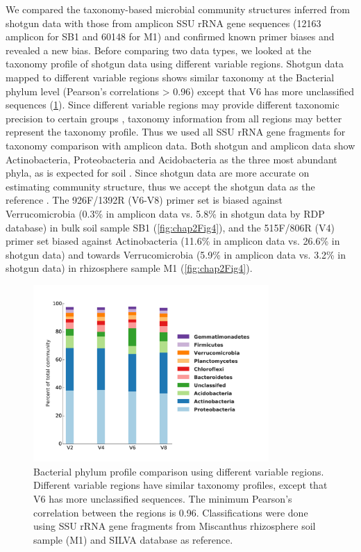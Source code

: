 \documentclass[]{msu-thesis}
\begin{document}
We compared the taxonomy-based microbial community structures inferred from shotgun data with those from amplicon SSU rRNA gene sequences (12163 amplicon for SB1 and 60148 for M1) and confirmed known primer biases and revealed a new bias. Before comparing two data types, we looked at the taxonomy profile of shotgun data using different variable regions. Shotgun data mapped to different variable regions shows similar taxonomy at the Bacterial phylum level (Pearson’s correlations > 0.96) except that V6 has more unclassified sequences (\cref{fig:chap2FigS6}). Since different variable regions may provide different taxonomic precision to certain groups \cite{guo_taxonomic_2013}, taxonomy information from all regions may better represent the taxonomy profile. Thus we used all SSU rRNA gene fragments for taxonomy comparison with amplicon data. Both shotgun and amplicon data show Actinobacteria, Proteobacteria and Acidobacteria as the three most abundant phyla, as is expected for soil \cite{janssen_identifying_2006}. Since shotgun data are more accurate on estimating community structure, thus we accept the shotgun data as the reference \cite{haas_chimeric_2011,shakya_comparative_2013}. The 926F/1392R (V6-V8) primer set is biased against Verrucomicrobia (0.3\% in amplicon data vs. 5.8\% in shotgun data by RDP database) in bulk soil sample SB1 (\cref{fig:chap2Fig4}), and the 515F/806R (V4) primer set biased against Actinobacteria (11.6\% in amplicon data vs. 26.6\% in shotgun data) and towards Verrucomicrobia (5.9\% in amplicon data vs. 3.2\% in shotgun data) in rhizosphere sample M1 (\cref{fig:chap2Fig4}).


\begin{figure}[tbph!]
  \centering
  \includegraphics[width=0.80\textwidth]{figs/chap2_figS6}
  \caption[Bacterial phylum profile comparison using different variable regions]{Bacterial phylum profile comparison using different variable regions. Different variable regions have similar taxonomy profiles, except that V6 has more unclassified sequences. The minimum Pearson’s correlation between the regions is 0.96. Classifications were done using SSU rRNA gene fragments from Miscanthus rhizosphere soil sample (M1) and SILVA database as reference.}
  \label{fig:chap2FigS6}
\end{figure}
\end{document}
